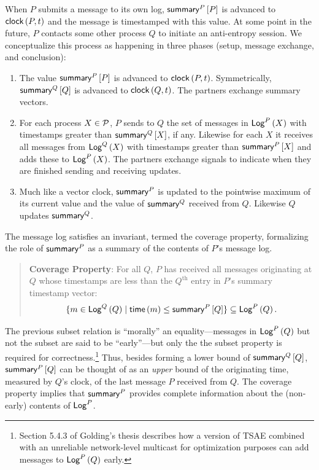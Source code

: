 \documentclass[]             %
{NASA}                       %
\theoremstyle{definition}
\begin{document}
When $P$ submits a message to its own log, $\mathsf{summary}^{P}\left[P\right]$ is
advanced to $\mathsf{clock}\left(P, t\right)$ and the message is timestamped with this
value. At some point in the future, $P$ contacts some other process
$Q$ to initiate an anti-entropy session. We conceptualize this process
as happening in three phases (setup, message exchange, and conclusion):
\begin{enumerate}
\item The value $\mathsf{summary}^{P}\left[P\right]$ is advanced to $\mathsf{clock}\left(P, t\right)$. Symmetrically,
  $\mathsf{summary}^{Q}\left[Q\right]$ is advanced to $\mathsf{clock}\left(Q, t\right)$. The partners exchange summary vectors.
\item For each process $X \in \mathcal{P}$, $P$ sends to $Q$ the set of
  messages in $\mathsf{Log}^{P}\left(X\right)$ with timestamps greater than
  $\mathsf{summary}^{Q}\left[X\right]$, if any. Likewise for each $X$ it receives all messages
  from $\mathsf{Log}^{Q}\left(X\right)$ with timestamps greater than $\mathsf{summary}^{P}\left[X\right]$ and
  adds these to $\mathsf{Log}^{P}\left(X\right)$. The partners exchange signals to indicate
  when they are finished sending and receiving updates.
\item Much like a vector clock, $\mathsf{summary}^{P}$ is updated to the
  pointwise maximum of its current value and the value of
  $\mathsf{summary}^{Q}$ received from $Q$. Likewise $Q$ updates
  $\mathsf{summary}^{Q}$.
\end{enumerate}
The message log satisfies an invariant, termed the coverage property,
formalizing the role of $\mathsf{summary}^{P}$ as a summary of the contents
of $P$'s message log.
\begin{quote}
  \textbf{Coverage Property}: For all $Q$, $P$ has received
  all messages originating at $Q$ whose timestamps are less than the
  $Q^\textrm{th}$ entry in $P$'s summary timestamp vector:
  \[ \{m \in \mathsf{Log}^{Q}\left(Q\right) \mid \mathsf{time}\left(m\right) \leq \mathsf{summary}^{P}\left[Q\right] \} \subseteq \mathsf{Log}^{P}\left(Q\right). \]
\end{quote}
The previous subset relation is ``morally'' an equality---messages in
$\mathsf{Log}^{P}\left(Q\right)$ but not the subset are said to be ``early''---but only the
the subset property is required for correctness.\footnote{Section
  5.4.3 of Golding's thesis describes how a version of TSAE
  combined with an unreliable network-level multicast for optimization purposes can add
  messages to $\mathsf{Log}^{P}\left(Q\right)$ early.} Thus, besides forming a lower
bound of $\mathsf{summary}^{Q}\left[Q\right]$, $\mathsf{summary}^{P}\left[Q\right]$ can be thought of as an
\emph{upper} bound of the originating time, measured by $Q$'s clock,
of the last message $P$ received from $Q$. The coverage property
implies that $\mathsf{summary}^{P}$ provides complete information about the
(non-early) contents of $\mathsf{Log}^{P}$.
\end{document}
